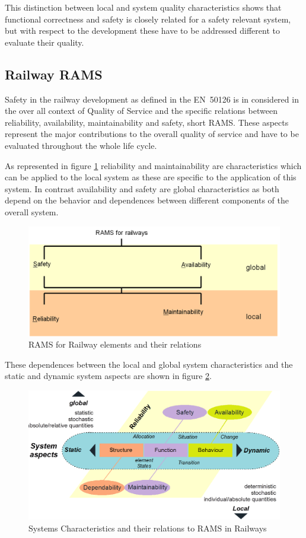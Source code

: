 \documentclass{template/openetcs_report}
\begin{document}
This distinction between local and system quality characteristics shows that functional correctness and safety is closely related for a safety relevant system, but with respect to the development these have to be addressed different to evaluate their quality.

\subsection{Railway RAMS}

Safety in the railway development as defined in the EN~50126 is in considered in the over all context of Quality of Service and the specific relations between reliability, availability, maintainability and safety, short RAMS. These aspects represent the major contributions to the overall quality of service and have to be evaluated throughout the whole life cycle.

As represented in figure \ref{fig:RAMS-EN50126} reliability and maintainability are characteristics which can be applied to the local system as these are specific to the application of this system. In contrast availability and safety are global characteristics as both depend on the behavior and dependences between different components of the overall system.

\begin{figure}[htbp]
\centering
\includegraphics[width=0.7\linewidth]{images/bld_RAMS-Railway-50126}
\caption{RAMS for Railway elements and their relations \cite{Schnieder.2013}}
\label{fig:RAMS-EN50126}
\end{figure}

These dependences between the local and global system characteristics and the static and dynamic system aspects are shown in figure \ref{fig:Reliability-RAMS}. 

\begin{figure}[htbp]
\centering
\includegraphics[width=0.7\linewidth]{images/bld_Reliability-system-characteristics}
\caption{Systems Characteristics and their relations to RAMS in Railways \cite{Schnieder.2013}}
\label{fig:Reliability-RAMS}
\end{figure}
\end{document}

